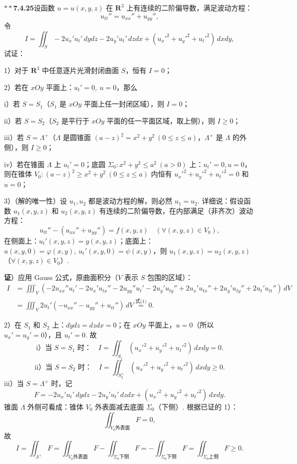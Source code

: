 \documentclass[UTF8,12pt,a4paper,fontset=fandol]{ctexart}
\providecommand{\xlongequal}[1]{\overset{#1}{=}}
\begin{document}
\noindent\textbf{$**$7.4.25}\quad 设函数 $u=u(x,y,z)$ 在 $\mathbf R^3$ 上有连续的二阶偏导数，满足波动方程：
\[
u_{tt}''=u_{xx}''+u_{yy}'', \tag{1}
\]
令
\[
I=\iint_S-2u_x'u_t'\,dydz-2u_y'u_t'\,dzdx+(u_x'^2+u_y'^2+u_t'^2)\,dxdy,
\]
试证：

1）对于 $\mathbf R^3$ 中任意逐片光滑封闭曲面 $S$，恒有 $I=0$；

2）若在 $xOy$ 平面上：$u_t'=0,\ u=0$，那么

i）若 $S=S_1$（$S_1$ 是 $xOy$ 平面上任一封闭区域），则 $I=0$；

ii）若 $S=S_2$（$S_2$ 是平行于 $xOy$ 平面的任一平面区域，取上侧），则 $I\ge0$；

iii）若 $S=\Lambda^+$（$\Lambda$ 是圆锥面 $(a-z)^2=x^2+y^2\ (0\le z\le a)$，$\Lambda^+$ 是 $\Lambda$ 的外侧），则 $I\ge0$；

iv）若在锥面 $\Lambda$ 上 $u_t'=0$；底圆 $\Sigma_0:x^2+y^2\le a^2\ (a>0)$ 上：$u_t'=0,u=0$，则在锥体 $V_0:(a-z)^2\ge x^2+y^2\ (0\le z\le a)$ 内恒有 $u_x'^2+u_y'^2+u_t'^2=0$ 和 $u=0$；

3）（解的唯一性）设 $u_1,u_2$ 都是波动方程的解，则必然 $u_1=u_2$. 详细说：假设函数 $u_1(x,y,z)$ 和 $u_2(x,y,z)$ 有连续的二阶偏导数，在内部满足（非齐次）波动方程：
\[
u_{tt}''-(u_{xx}''+u_{yy}'')=f(x,y,z)\quad(\forall(x,y,z)\in V_0),
\]
在侧面上：$u_t'(x,y,z)=g(x,y,z)$；底面上：$u(x,y,0)=\varphi(x,y),\ u_t'(x,y,0)=\psi(x,y)$，则 $u_1(x,y,z)=u_2(x,y,z)$（$\forall(x,y,z)\in V_0$）.

\noindent\textbf{证}）应用 Gauss 公式，原曲面积分（$V$ 表示 $S$ 包围的区域）：
\[
\begin{aligned}
I&=\iiint_V(-2u_{xx}''u_t'-2u_x'u_{tx}''-2u_{yy}''u_t'-2u_y'u_{ty}''
+2u_x'u_{tx}''+2u_y'u_{ty}''+2u_t'u_{tt}'')\,dV\\
&=\iiint_V2u_t'(-u_{xx}''-u_{yy}''+u_{tt}'')\,dV\xlongequal{\text{式(1)}}0.
\end{aligned}
\]

2）在 $S_1$ 和 $S_2$ 上：$dydz=dzdx=0$；在 $xOy$ 平面上，$u=0$（所以 $u_x'=u_y'=0$），且 $u_t'=0$. 故
\[
\text{i）当 }S=S_1\text{ 时：}\quad I=\iint_{S_1}(u_x'^2+u_y'^2+u_t'^2)\,dxdy=0.
\]
\[
\text{ii）当 }S=S_2\text{ 时：}\quad I=\iint_{S_2^+}(u_x'^2+u_y'^2+u_t'^2)\,dxdy\ge0.
\]
iii）当 $S=\Lambda^+$ 时，记
\[
F=-2u_x'u_t'\,dydz-2u_y'u_t'\,dzdx+(u_x'^2+u_y'^2+u_t'^2)\,dxdy.
\]
锥面 $\Lambda$ 外侧可看成：锥体 $V_0$ 外表面减去底面 $\Sigma_0$（下侧）. 根据已证的 1）：
\[
\iint_{V_0\text{外表面}}F=0,
\]
故
\[
I=\iint_{\Lambda^+}F
=\iint_{V_0\text{外表面}}F-\iint_{\Sigma_0\text{下侧}}F
=-\iint_{\Sigma_0\text{下侧}}F
=\iint_{\Sigma_0\text{上侧}}F\ge0.
\]
\end{document}
